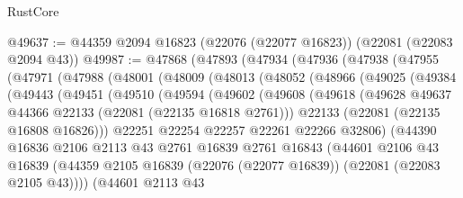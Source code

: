 \begin{lexlean}{RustCore}
\begin{coremodule}
@49637 := @44359 @2094 @16823 (@22076 (@22077 @16823)) (@22081 (@22083 @2094 @43))
@49987 := @47868
    (@47893
      (@47934
        (@47936
          (@47938
            (@47955
              (@47971
                (@47988
                  (@48001
                    (@48009
                      (@48013
                        (@48052
                          (@48966
                            (@49025
                              (@49384
                                (@49443
                                  (@49451
                                    (@49510
                                      (@49594
                                        (@49602
                                          (@49608
                                            (@49618
                                              (@49628
                                                @49637
                                                @44366
                                                @22133
                                                (@22081 (@22135 @16818 @2761)))
                                              @22133
                                              (@22081 (@22135 @16808 @16826)))
                                            @22251
                                            @22254
                                            @22257
                                            @22261
                                            @22266
                                            @32806)
                                          (@44390
                                            @16836
                                            @2106
                                            @2113
                                            @43
                                            @2761
                                            @16839
                                            @2761
                                            @16843
                                            (@44601
                                              @2106
                                              @43
                                              @16839
                                              (@44359
                                                @2105
                                                @16839
                                                (@22076 (@22077 @16839))
                                                (@22081 (@22083 @2105 @43))))
                                            (@44601
                                              @2113
                                              @43

\end{coremodule}
\end{lexlean}
